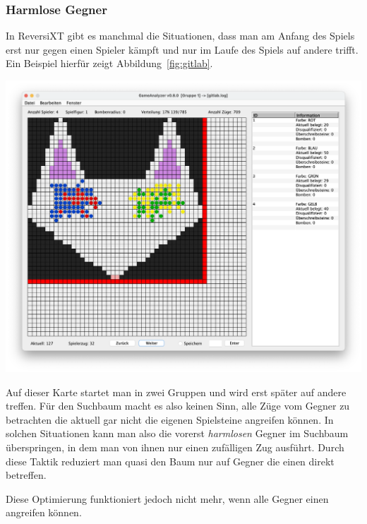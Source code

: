 \subsubsection{Harmlose Gegner}
In ReversiXT gibt es manchmal die Situationen, dass man am Anfang des Spiels erst nur gegen einen Spieler k\"ampft und nur im Laufe des Spiels auf andere trifft.
Ein Beispiel hierf\"ur zeigt Abbildung~\ref{fig:gitlab}.

\vspace{1em}
\begin{minipage}{\linewidth}
    \centering
    \includegraphics[width=0.8\linewidth]{pics/gitlab}
    \label{fig:gitlab}
\end{minipage}
\vspace{1em}

Auf dieser Karte startet man in zwei Gruppen und wird erst sp\"ater auf andere treffen.
F\"ur den Suchbaum macht es also keinen Sinn, alle Z\"uge vom Gegner zu betrachten die aktuell gar nicht die eigenen Spielsteine angreifen k\"onnen.
In solchen Situationen kann man also die vorerst \textit{harmlosen} Gegner im Suchbaum \"uberspringen, in dem man von ihnen nur einen zuf\"alligen Zug ausf\"uhrt.
Durch diese Taktik reduziert man quasi den Baum nur auf Gegner die einen direkt betreffen.

Diese Optimierung funktioniert jedoch nicht mehr, wenn alle Gegner einen angreifen k\"onnen.


\bigskip
\newpage